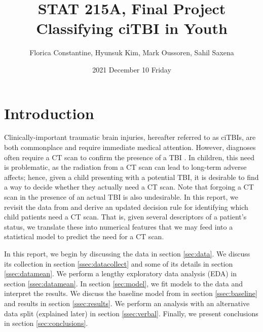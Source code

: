 \documentclass[11pt, letterpaper]{amsart}
\title{STAT 215A, Final Project\\Classifying ciTBI in Youth}
\author{Florica Constantine, Hyunsuk Kim, Mark Oussoren, Sahil Saxena}
\date{2021 December 10 Friday}
\let\Oldsection\section
\renewcommand{\section}{\FloatBarrier\Oldsection}
\begin{document}
\maketitle

\section{Introduction}


Clinically-important traumatic brain injuries, hereafter referred to as ciTBIs, are both commonplace and require immediate medical attention. However, diagnoses often require a CT scan to confirm the presence of a TBI \cite{brenner2002estimating}. In children, this need is problematic, as the radiation from a CT scan can lead to long-term adverse affects; hence, given a child presenting with a potential TBI, it is desirable to find a way to decide whether they actually need a CT scan. Note that forgoing a CT scan in the presence of an actual TBI is also undesirable. In this report, we revisit the data from \cite{kuppermann2009identification} and derive an updated decision rule for identifying which child patients need a CT scan. That is, given several descriptors of a patient's status, we translate these into numerical features that we may feed into a statistical model to predict the need for a CT scan. 

In this report, we begin by discussing the data in section \ref{sec:data}. We discuss its collection in section \ref{ssec:datacollect} and some of its details in section \ref{ssec:datamean}. We perform a lengthy exploratory data analysis (EDA) in section \ref{ssec:datamean}. In section \ref{sec:model}, we fit models to the data and interpret the results. We discuss the baseline model from \cite{kuppermann2009identification} in section \ref{ssec:baseline} and results in section \ref{ssec:results}. We perform an analysis with an alternative data split (explained later) in section \ref{ssec:verbal}. Finally, we present conclusions in section \ref{sec:conclusions}. 
\end{document}
